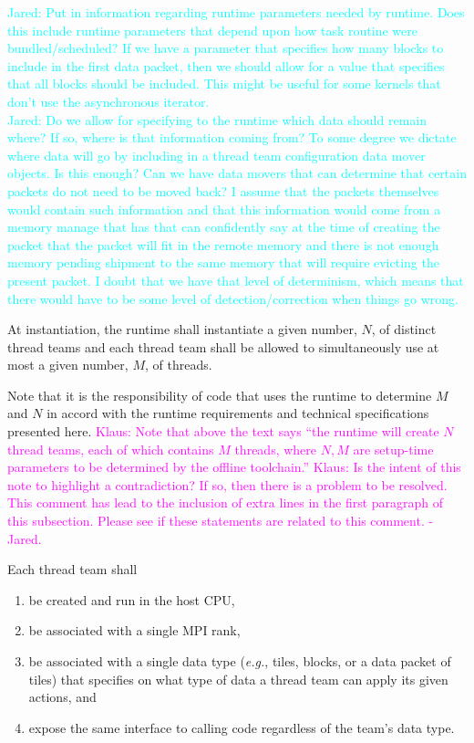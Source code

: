 \documentclass{article}
\newcommand{\eg}{\textit{e.g.}}   %
\newcommand{\Jared}[1]          {\textcolor{cyan}{Jared: #1}}
\newcommand{\Klaus}[1]          {\textcolor{magenta}{Klaus: #1}}
\newcommand{\KlausRfromJO}[1]   {\textcolor{magenta}{Klaus: #1 - Jared.}}
\newcommand{\taskroutine}        {task routine\xspace}
\begin{document}
\Jared{Put in information regarding runtime parameters needed by
runtime.  Does this include runtime parameters that depend upon how \taskroutine were
bundled/scheduled?  If we have a parameter that specifies how many blocks to
include in the first data packet, then we should allow for a value that
specifies that all blocks should be included.  This might be useful for some
kernels that don't use the asynchronous iterator.}\\

\Jared{Do we allow for specifying to the runtime which data should
remain where?  If so, where is that information coming from?  To some degree we
dictate where data will go by including in a thread team configuration data
mover objects.  Is this enough?  Can we have data movers that can determine that
certain packets do not need to be moved back?  I assume that the packets
themselves would contain such information and that this information would come
from a memory manage that has that can confidently say at the time of creating
the packet that the packet will fit in the remote memory and there is not enough
memory pending shipment to the same memory that will require evicting the
present packet.  I doubt that we have that level of determinism, which means
that there would have to be some level of detection/correction when things go
wrong.}

\begin{req}
At instantiation, the runtime shall instantiate a given number, $N$, of distinct
thread teams and each thread team shall be allowed to simultaneously use
at most a given number, $M$, of threads.
\end{req}

Note that it is the responsibility of code that uses the runtime to determine $M$ and $N$ in
accord with the runtime requirements and technical specifications presented
here.
\Klaus{Note that above the text says
``the runtime will create $N$ thread teams, each of which contains $M$
threads, where $N, M$ are setup-time parameters to be determined by the offline
toolchain.''}
\KlausRfromJO{Is the intent of this note to highlight a contradiction?  If so,
then there is a problem to be resolved.  This comment has lead to the inclusion
of extra lines in the first paragraph of this subsection.  Please see if these
statements are related to this comment.}

\begin{req}
Each thread team shall
\begin{enumerate}
\item{be created and run in the host CPU,}
\item{be associated with a single MPI rank,}
\item{be associated with a single data type (\eg, tiles, blocks, or a
data packet of tiles) that specifies on what type of data a thread team can
apply its given actions, and}
\item{expose the same interface to calling code regardless of the team's data
type.}
\end{enumerate}
\end{req}
\end{document}
